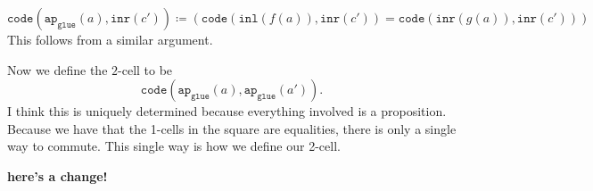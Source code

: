 \documentclass[11pt]{amsart}
\newcommand{\type}[1]{\mathtt{#1}}
\begin{document}
\vspace{2em}

$ 
\type{ code } \left( \type{ ap }_{ \type{ glue } } ( a ) , \type{ inr } ( c' ) \right) \coloneqq 
	\left( 
		\type{ code } ( \type{ inl } ( f ( a ) ) , \type{ inr } ( c' ) ) =
		\type{ code } ( \type{ inr } ( g ( a ) ) , \type{ inr } ( c' ) ) 
	\right) 
$ 
This follows from a similar argument.

\vspace{2em}

Now we define the $2$-cell to be
\[
	\type{ code } ( \type{ ap }_\type{ glue } ( a ) , \type{ ap }_\type{ glue } ( a' )  ) .
\]
I think this is uniquely determined because
everything involved is a proposition. 
Because we have that the 1-cells 
in the square are equalities,
there is only a single way to commute.
This single way is how we define our 2-cell. 

\textbf{here's a change!}



\end{document}
